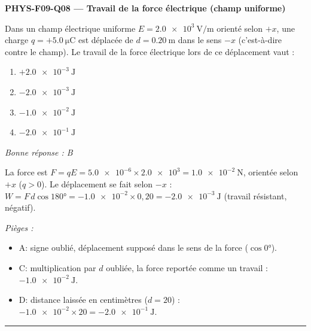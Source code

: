 \documentclass[11pt,a4paper]{article}
\begin{document}
\noindent\textbf{PHYS-F09-Q08 --- Travail de la force électrique (champ uniforme)}\par
Dans un champ électrique uniforme $E=\qty{2.0e3}{\volt\per\metre}$ orienté selon $+x$, une charge $q=+\qty{5.0}{\micro\coulomb}$ est déplacée de $d=\qty{0.20}{\metre}$ dans le sens $-x$ (c'est-à-dire contre le champ). Le travail de la force électrique lors de ce déplacement vaut :
\begin{enumerate}[label=\Alph*)]
\item $+\qty{2.0e-3}{\joule}$
\item $-\qty{2.0e-3}{\joule}$
\item $-\qty{1.0e-2}{\joule}$
\item $-\qty{2.0e-1}{\joule}$
\end{enumerate}
\textit{Bonne réponse : B}\par
La force est $F=qE=\num{5.0e-6}\times\num{2.0e3}=\qty{1.0e-2}{\newton}$, orientée selon $+x$ ($q>0$). Le déplacement se fait selon $-x$ : $W=F\,d\cos\ang{180}=-\num{1.0e-2}\times 0{,}20=-\qty{2.0e-3}{\joule}$ (travail résistant, négatif).\par
\textit{Pièges :}
\begin{itemize}
\item A: signe oublié, déplacement supposé dans le sens de la force ($\cos\ang{0}$).
\item C: multiplication par $d$ oubliée, la force reportée comme un travail : $-\qty{1.0e-2}{\joule}$.
\item D: distance laissée en centimètres ($d=20$) : $-\num{1.0e-2}\times 20=-\qty{2.0e-1}{\joule}$.
\end{itemize}
\vspace{8pt}\hrule\vspace{8pt}
\end{document}
